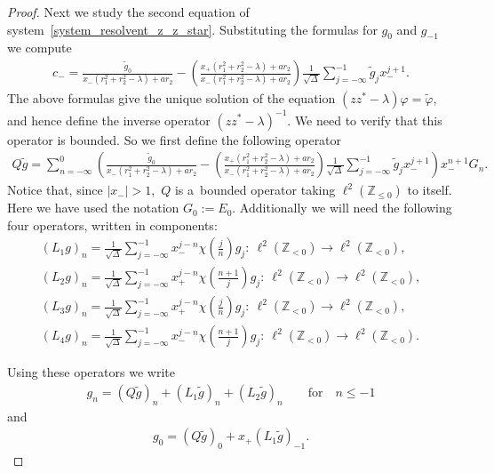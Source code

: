 \documentclass[pdftex]{sigma}
\numberwithin{equation}{section}
\begin{document}
\begin{proof}
Next we study the second equation of system~\eqref{system_resolvent_z_z_star}.
Substituting the formulas for $g_{0}$ and $g_{-1}$ we compute
\begin{gather*}
c_-=\frac{\tilde{g}_0}{x_-(r_1^2+r_2^2-\lambda)+ar_2}-\left(\frac{{x_+(r_1^2+r_2^2-\lambda)+ar_2}}{x_-(r_1^2+r_2^2-\lambda)+ar_2}\right)
\frac{1}{\sqrt{\Delta}}\sum\limits_{j=-\infty}^{-1}\tilde{g}_jx_-^{j+1}.
\end{gather*}
The above formulas give the unique solution of the equation $(zz^*-\lambda)\varphi=\tilde{\varphi}$, and hence def\/ine
the inverse operator $(zz^*-\lambda)^{-1}$.
We need to verify that this operator is bounded.
So we f\/irst def\/ine the following operator
\begin{gather*}
Q\tilde{g}=\!\sum\limits_{n=-\infty}^0\!\! \left(\!\frac{\tilde{g}_0}{x_-(r_1^2+r_2^2-\lambda)+ar_2}-
\!\left(\frac{{x_+(r_1^2+r_2^2-\lambda)+ar_2}}{x_-(r_1^2+r_2^2-\lambda)+ar_2}\right)\!
\frac{1}{\sqrt{\Delta}}\! \sum\limits_{j=-\infty}^{-1}\!\! \tilde{g}_jx_-^{j+1}\!\right)\!x_-^{n+1}G_n.
\end{gather*}
Notice that, since $|x_-|>1$,~$Q$ is a~bounded operator taking $\ell^2({\mathbb Z}_{\leq 0})$ to itself.
Here we have used the notation $G_0:= E_0$.
Additionally we will need the following four operators, written in components:
\begin{gather*}%
\left(L_1g\right)_n =\frac{1}{\sqrt{\Delta}}\sum\limits_{j=-\infty}^{-1}x_-^{j-n}\chi\left(\frac{j}{n}\right)g_j: \
\ell^2({\mathbb Z}_{<0})\to \ell^2({\mathbb Z}_{<0}),
\\
\left(L_2g\right)_n =\frac{1}{\sqrt{\Delta}}\sum\limits_{j=-\infty}^{-1}x_+^{j-n}\chi\left(\frac{n+1}{j}\right)g_j: \
\ell^2({\mathbb Z}_{<0})\to \ell^2({\mathbb Z}_{<0}),
\\
\left(L_3g\right)_n =\frac{1}{\sqrt{\Delta}}\sum\limits_{j=-\infty}^{-1}x_+^{j-n}\chi\left(\frac{j}{n}\right)g_j: \
\ell^2({\mathbb Z}_{<0})\to \ell^2({\mathbb Z}_{<0}),
\\
\left(L_4g\right)_n =\frac{1}{\sqrt{\Delta}}\sum\limits_{j=-\infty}^{-1}x_-^{j-n}\chi\left(\frac{n+1}{j}\right)g_j: \
\ell^2({\mathbb Z}_{<0})\to \ell^2({\mathbb Z}_{<0}).
\end{gather*}

Using these operators we write
\begin{gather*}
g_n=\left(Q\tilde{g}\right)_n+\left(L_1\tilde{g}\right)_n+\left(L_2\tilde{g}\right)_n \qquad\text{for}\quad  n\leq -1
\end{gather*}
and
\begin{gather*}
g_0 =\left(Q\tilde{g}\right)_0+x_+\left(L_1\tilde{g}\right)_{-1}.
\end{gather*}


\end{proof}
\end{document}
